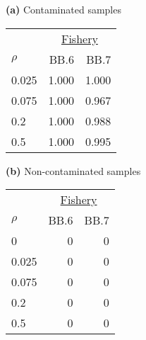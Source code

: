 {\bf (a)} Contaminated samples 
\begin{center}
\begin{tabular}{lrr} 
  &  \multicolumn{2}{c}{\underline{Fishery}} \\
$\rho~~~~~~~$  &  BB.6            &  BB.7            \\  
\hline 0.025   &  1.000           &  1.000           \\  
0.075           &  1.000           &  0.967           \\  
0.2             &  1.000           &  0.988           \\  
0.5             &  1.000           &  0.995           \\  
\end{tabular} 
\end{center}
{\bf (b)} Non-contaminated samples 
\begin{center}
\begin{tabular}{lrr} 
  &  \multicolumn{2}{c}{\underline{Fishery}} \\
$\rho~~~~~~~$  &  BB.6            &  BB.7            \\  
\hline 0       &  0               &  0               \\  
0.025           &  0               &  0               \\  
0.075           &  0               &  0               \\  
0.2             &  0               &  0               \\  
0.5             &  0               &  0               \\  
\end{tabular} 
\end{center}
